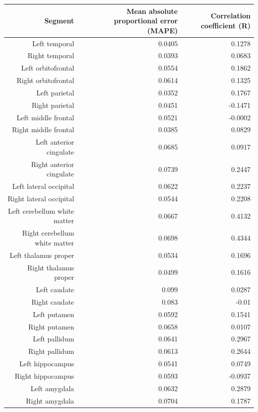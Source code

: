 \documentclass{article}
\begin{document}
  \begin{table}[h]
  
  \begin{centering}
    \tiny
    \begin{tabular}{|r|r|r|}
      \hline\hline
      \textbf{Segment} & \textbf{Mean absolute proportional error (MAPE)} & \textbf{Correlation coefficient (R)} \\\hline
      Left temporal & 0.0405 & 0.1278 \\
      Right temporal & 0.0393 & 0.0683 \\
      Left orbitofrontal & 0.0554 & 0.1862 \\
      Right orbitofrontal & 0.0614 & 0.1325 \\
      Left parietal & 0.0352 & 0.1767 \\
      Right parietal & 0.0451 & -0.1471 \\
      Left middle frontal & 0.0521 & -0.0002 \\
      Right middle frontal & 0.0385 & 0.0829 \\
      Left anterior cingulate & 0.0685 & 0.0917 \\
      Right anterior cingulate & 0.0739 & 0.2447 \\
      Left lateral occipital & 0.0622 & 0.2237 \\
      Right lateral occipital & 0.0544 & 0.2208 \\
      Left cerebellum white matter & 0.0667 & 0.4132 \\
      Right cerebellum white matter & 0.0698 & 0.4344 \\
      Left thalamus proper & 0.0534 & 0.1696 \\
      Right thalamus proper & 0.0499 & 0.1616 \\
      Left caudate & 0.099 & 0.0287 \\
      Right caudate & 0.083 & -0.01 \\
      Left putamen & 0.0592 & 0.1541 \\
      Right putamen & 0.0658 & 0.0107 \\
      Left pallidum & 0.0641 & 0.2967 \\
      Right pallidum & 0.0613 & 0.2644 \\
      Left hippocampus & 0.0541 & 0.0749 \\
      Right hippocampus & 0.0593 & -0.0937 \\
      Left amygdala & 0.0632 & 0.2879 \\
      Right amygdala & 0.0704 & 0.1787 \\

\end{tabular}
\end{centering}
\end{table}
\end{document}
